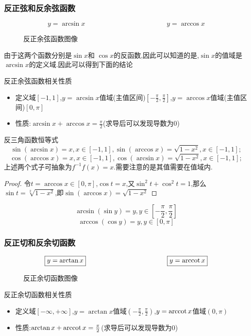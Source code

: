 \documentclass[12pt, a4paper, oneside, UTF8]{ctexbook}  %
\begin{document}
\subsubsection{反正弦和反余弦函数}
$$
    \boxed{y=\arcsin x}
    \qquad \qquad \qquad \qquad \qquad \qquad
    \boxed{y=\arccos x}
$$
\begin{figure}[H] \centering
    \caption{反正余弦函数图像}
\end{figure}
由于这两个函数分别是$\sin x$和 $\cos x$的反函数,因此可以知道的是,$\sin x$的值域是$\arcsin x$的定义域.因此可以得到下面的结论
\begin{criterion}{反正余弦函数相关性质}{}
    \begin{itemize}
        \item 定义域$[-1,1]$,$y=\arcsin x$值域(主值区间)$[-\frac{\pi}{2},\frac{\pi}{2}]$,$y=\arccos x$值域(主值区间)$[0,\pi]$
        \item 性质:$\arcsin x+\arccos x=\frac{\pi}{2}$(求导后可以发现导数为0)
    \end{itemize}
\end{criterion}
\begin{criterion}{反三角函数恒等式}{}
    $$
        \sin(\arcsin x)=x,x\in[-1,1],\sin(\arccos x)=\sqrt{1-x^2},x\in[-1,1];
    $$
    $$
        \cos(\arccos x)=x,x\in[-1,1],\cos(\arcsin x)=\sqrt{1-x^2},x\in[-1,1];
    $$
    上述两个式子可抽象为$f^{-1}f(x)=x$.需要注意的是其值需要在值域内.
    \begin{proof}
        令$t=\arccos x \in [0,\pi]$,$\cos t = x$,又$\sin ^2 t+\cos ^2 t=1$,那么$\sin t=\sqrt[2]{1-x^2}$,即$\sin(\arccos x)=\sqrt{1-x^2}$
    \end{proof}
    $$
        \arcsin(\sin y)=y,y\in\left[-\frac{\pi}{2},\frac{\pi}{2}\right]
    $$
    $$
        \arccos(\cos y)=y,y\in\left[0,\pi\right]
    $$
\end{criterion}
\subsubsection{反正切和反余切函数}
$$
    \boxed{y=\arctan x}
    \qquad \qquad \qquad \qquad \qquad \qquad
    \boxed{y=\mathrm{arccot}\, x}
$$
\begin{figure}[H] \centering
    \caption{反正余切函数图像}
\end{figure}
\begin{criterion}{反正余切函数相关性质}{}
    \begin{itemize}
        \item 定义域$[-\infty,+\infty]$,$y=\arctan x$值域$(-\frac{\pi}{2},\frac{\pi}{2})$,$y=\mathrm{arccot}\, x$值域$(0,\pi)$
        \item 性质:$\arctan x+\mathrm{arccot}\, x=\frac{\pi}{2}$(求导后可以发现导数为0)
    \end{itemize}
\end{criterion}
\end{document}
